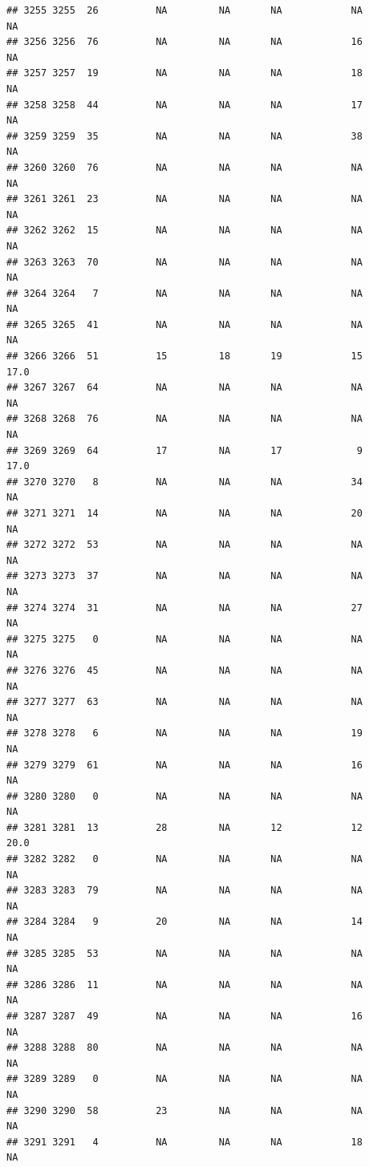 \documentclass[man]{apa6}
\begin{document}
\begin{verbatim}
## 3255 3255  26          NA         NA       NA            NA       NA
## 3256 3256  76          NA         NA       NA            16       NA
## 3257 3257  19          NA         NA       NA            18       NA
## 3258 3258  44          NA         NA       NA            17       NA
## 3259 3259  35          NA         NA       NA            38       NA
## 3260 3260  76          NA         NA       NA            NA       NA
## 3261 3261  23          NA         NA       NA            NA       NA
## 3262 3262  15          NA         NA       NA            NA       NA
## 3263 3263  70          NA         NA       NA            NA       NA
## 3264 3264   7          NA         NA       NA            NA       NA
## 3265 3265  41          NA         NA       NA            NA       NA
## 3266 3266  51          15         18       19            15     17.0
## 3267 3267  64          NA         NA       NA            NA       NA
## 3268 3268  76          NA         NA       NA            NA       NA
## 3269 3269  64          17         NA       17             9     17.0
## 3270 3270   8          NA         NA       NA            34       NA
## 3271 3271  14          NA         NA       NA            20       NA
## 3272 3272  53          NA         NA       NA            NA       NA
## 3273 3273  37          NA         NA       NA            NA       NA
## 3274 3274  31          NA         NA       NA            27       NA
## 3275 3275   0          NA         NA       NA            NA       NA
## 3276 3276  45          NA         NA       NA            NA       NA
## 3277 3277  63          NA         NA       NA            NA       NA
## 3278 3278   6          NA         NA       NA            19       NA
## 3279 3279  61          NA         NA       NA            16       NA
## 3280 3280   0          NA         NA       NA            NA       NA
## 3281 3281  13          28         NA       12            12     20.0
## 3282 3282   0          NA         NA       NA            NA       NA
## 3283 3283  79          NA         NA       NA            NA       NA
## 3284 3284   9          20         NA       NA            14       NA
## 3285 3285  53          NA         NA       NA            NA       NA
## 3286 3286  11          NA         NA       NA            NA       NA
## 3287 3287  49          NA         NA       NA            16       NA
## 3288 3288  80          NA         NA       NA            NA       NA
## 3289 3289   0          NA         NA       NA            NA       NA
## 3290 3290  58          23         NA       NA            NA       NA
## 3291 3291   4          NA         NA       NA            18       NA

\end{verbatim}
\end{document}
